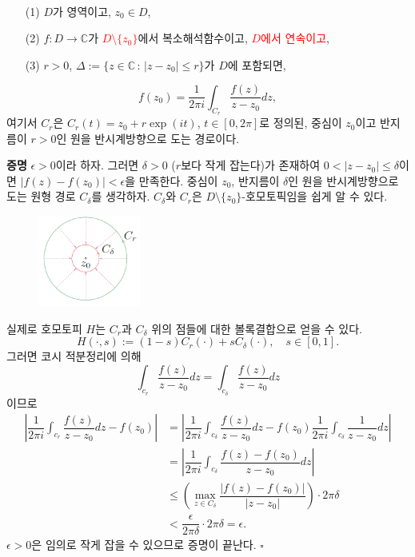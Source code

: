 \begin{salt_prop} \label{prop-3-5}
\
\begin{itemize}
\item[(1)] $D$가 영역이고, $z_0\in D$,
\item[(2)] $f:D\to\mathbb C$가 \textcolor{red}{$D\setminus \{z_0\}$}에서 복소해석함수이고,
\textcolor{red}{$D$에서 연속이고},
\item[(3)] $r>0$, 
$\Delta := \{ z\in \mathbb C\,:\, |z-z_0| \le r\}$가 $D$에 포함되면,
\end{itemize}
\[
f(z_0) = \dfrac1{2\pi i} \int_{C_r} \dfrac{f(z)}{z-z_0} dz, 
\]
여기서 $C_r$은 $C_r(t) = z_0 + r\exp(it)$, $t\in [0,2\pi]$로 
정의된, 중심이 $z_0$이고 반지름이 $r>0$인 
원을 반시계방향으로 도는 경로이다.
\end{salt_prop}

{\bf 증명}
$\epsilon>0$이라 하자.
그러면 $\delta>0$ ($r$보다 작게 잡는다)가 존재하여
$0<|z-z_0|\le \delta$이면 $|f(z) - f(z_0)|<\epsilon$을 만족한다.
중심이 $z_0$, 반지름이 $\delta$인 원을 반시계방향으로 도는 원형 경로 $C_\delta$를 생각하자.
$C_\delta$와 $C_r$은 $D\setminus\{z_0\}$-호모토픽임을 쉽게 알 수 있다.

\begin{figure}[h!]
\begin{center}
\includegraphics[width=0.3\textwidth]{./SaltChapter/fig-3-0-8}
\end{center}
\end{figure}

실제로 호모토피 $H$는 $C_r$과  $C_\delta$ 위의 점들에 대한 볼록결합으로 얻을 수 있다.
\[
H(\cdot, s) := (1-s)C_r(\cdot) + sC_\delta(\cdot), 
\quad s\in [0,1].
\]
그러면 코시 적분정리에 의해 
\[
\int_{c_r} \dfrac{f(z)}{z-z_0}dz = \int_{c_\delta} \dfrac{f(z)}{z-z_0}dz
\]
이므로
\begin{align*}
\left| \dfrac1{2\pi i} \int_{c_r} \dfrac{f(z)}{z-z_0}dz - f(z_0) \right|
&= \left|  \dfrac1{2\pi i}\int_{c_\delta} \dfrac{f(z)}{z-z_0}dz - 
f(z_0)  \dfrac1{2\pi i} \int_{c_\delta} \dfrac{1}{z-z_0}dz \right| \\
&= \left|  \dfrac1{2\pi i}\int_{c_\delta} \dfrac{f(z)-f(z_0)}{z-z_0}dz \right| \\
&\le \left( \max_{z\in C_\delta} \dfrac{|f(z)-f(z_0)|}{|z-z_0|}  \right) \cdot 2\pi\delta \\
&< \dfrac \epsilon{2\pi \delta} \cdot 2\pi \delta = \epsilon.
\end{align*}
$\epsilon>0$은 임의로 작게 잡을 수 있으므로 증명이 끝난다.
\hfill $\square$

